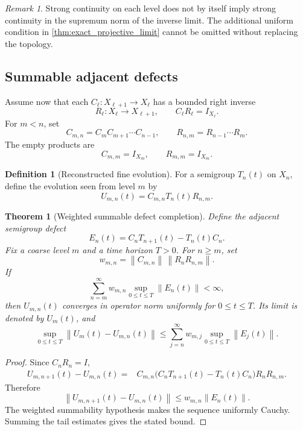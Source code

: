 \documentclass{aomart}
\newtheorem{theorem}{Theorem}[section]
\theoremstyle{definition}
\newtheorem{definition}[definition]{Definition}
\theoremstyle{remark}
\newtheorem{remark}[remark]{Remark}
\newcommand{\norm}[1]{\left\lVert#1\right\rVert}
\begin{document}
\begin{remark}
Strong continuity on each level does not by itself imply strong continuity in the supremum norm of the inverse limit. The additional uniform condition in \cref{thm:exact_projective_limit} cannot be omitted without replacing the topology.
\end{remark}

\subsection{Summable adjacent defects}

Assume now that each \(C_\ell:X_{\ell+1}\to X_\ell\) has a bounded right inverse
\[
R_\ell:X_\ell\to X_{\ell+1},
\qquad
C_\ell R_\ell=I_{X_\ell}.
\]
For \(m<n\), set
\[
C_{m,n}=C_mC_{m+1}\cdots C_{n-1},
\qquad
R_{n,m}=R_{n-1}\cdots R_m.
\]
The empty products are
\[
C_{m,m}=I_{X_m},
\qquad
R_{m,m}=I_{X_m}.
\]

\begin{definition}[Reconstructed fine evolution]
For a semigroup \(T_n(t)\) on \(X_n\), define the evolution seen from level \(m\) by
\[
U_{m,n}(t)=C_{m,n}T_n(t)R_{n,m}.
\]
\end{definition}

\begin{theorem}[Weighted summable defect completion]\label{thm:summable_defect_completion}
Define the adjacent semigroup defect
\[
E_n(t)=C_nT_{n+1}(t)-T_n(t)C_n.
\]
Fix a coarse level \(m\) and a time horizon \(T>0\). For \(n\geq m\), set
\[
w_{m,n}
=
\norm{C_{m,n}}\,
\norm{R_nR_{n,m}}.
\]
If
\[
\sum_{n=m}^{\infty}
w_{m,n}
\sup_{0\leq t\leq T}\norm{E_n(t)}<\infty,
\]
then \(U_{m,n}(t)\) converges in operator norm uniformly for \(0\leq t\leq T\). Its limit is denoted by \(U_m(t)\), and
\[
\sup_{0\leq t\leq T}
\norm{U_m(t)-U_{m,n}(t)}
\leq
\sum_{j=n}^{\infty}w_{m,j}
\sup_{0\leq t\leq T}\norm{E_j(t)}.
\]
\end{theorem}

\begin{proof}
Since \(C_nR_n=I\),
\[
\begin{aligned}
U_{m,n+1}(t)-U_{m,n}(t)
={}&
C_{m,n}
\bigl(C_nT_{n+1}(t)-T_n(t)C_n\bigr)
R_nR_{n,m}.
\end{aligned}
\]
Therefore
\[
\norm{U_{m,n+1}(t)-U_{m,n}(t)}
\leq
w_{m,n}\norm{E_n(t)}.
\]
The weighted summability hypothesis makes the sequence uniformly Cauchy. Summing the tail estimates gives the stated bound.
\end{proof}
\end{document}
